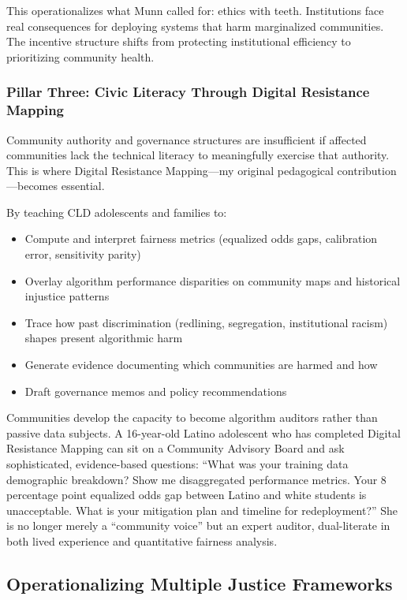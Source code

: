\documentclass[12pt,a4paper]{article}
\begin{document}
This operationalizes what Munn called for: ethics with teeth. Institutions face real consequences for deploying systems that harm marginalized communities. The incentive structure shifts from protecting institutional efficiency to prioritizing community health.

\subsubsection{Pillar Three: Civic Literacy Through Digital Resistance Mapping}

Community authority and governance structures are insufficient if affected communities lack the technical literacy to meaningfully exercise that authority. This is where Digital Resistance Mapping---my original pedagogical contribution---becomes essential.

By teaching CLD adolescents and families to:

\begin{itemize}
\item Compute and interpret fairness metrics (equalized odds gaps, calibration error, sensitivity parity)
\item Overlay algorithm performance disparities on community maps and historical injustice patterns
\item Trace how past discrimination (redlining, segregation, institutional racism) shapes present algorithmic harm
\item Generate evidence documenting which communities are harmed and how
\item Draft governance memos and policy recommendations
\end{itemize}

Communities develop the capacity to become algorithm auditors rather than passive data subjects. A 16-year-old Latino adolescent who has completed Digital Resistance Mapping can sit on a Community Advisory Board and ask sophisticated, evidence-based questions: ``What was your training data demographic breakdown? Show me disaggregated performance metrics. Your 8 percentage point equalized odds gap between Latino and white students is unacceptable. What is your mitigation plan and timeline for redeployment?'' She is no longer merely a ``community voice'' but an expert auditor, dual-literate in both lived experience and quantitative fairness analysis.

\subsection{Operationalizing Multiple Justice Frameworks}
\end{document}
